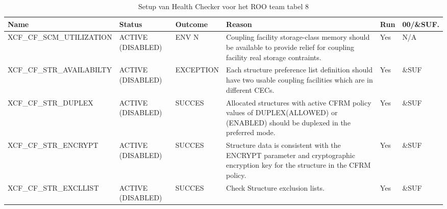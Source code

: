 \begin{landscape}
	\begin{table}[h]
		\begin{tabular}{|l|p{2.3cm}|l|p{4.5cm}|l|l|}
			\hline
			\textbf{Name}                       & \textbf{Status}   & \textbf{Outcome} & \textbf{Reason}    & \textbf{Run} &	\textbf{00/\&SUF.} \\ \hline
			XCF\_CF\_SCM\_UTILIZATION & ACTIVE (DISABLED) & ENV N     & Coupling facility storage-class memory should be   available to provide relief for coupling facility real storage   contraints.      & Yes & N/A   \\ \hline
			XCF\_CF\_STR\_AVAILABILTY & ACTIVE (DISABLED) & EXCEPTION & Each   structure preference list definition should have two usable coupling    facilities   which are in different CECs.             & Yes & \&SUF \\ \hline
			XCF\_CF\_STR\_DUPLEX      & ACTIVE (DISABLED) & SUCCES    & Allocated   structures with active CFRM policy values of   DUPLEX(ALLOWED)   or (ENABLED) should be duplexed in the preferred mode.  & Yes & \&SUF \\ \hline
			XCF\_CF\_STR\_ENCRYPT     & ACTIVE (DISABLED) & SUCCES    & Structure   data is consistent with the ENCRYPT parameter and cryptographic   encryption   key for the structure in the CFRM policy. & Yes & \&SUF \\ \hline
			XCF\_CF\_STR\_EXCLLIST    & ACTIVE (DISABLED) & SUCCES    & Check   Structure exclusion lists.                                                                                                   & Yes & \&SUF \\ \hline	
		\end{tabular}
		\caption[Health Checker  ROO team tabel 8]{Setup van Health Checker voor het ROO team tabel 8}
		\label{tbl:ROO Team Tabel 8}
	\end{table}
\end{landscape}

